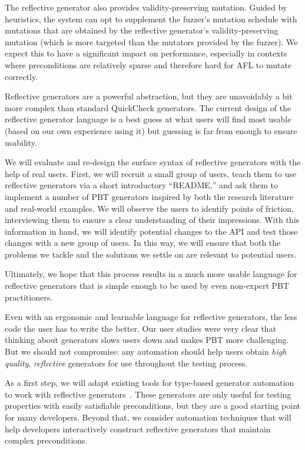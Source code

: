 The reflective generator also provides validity-preserving mutation. Guided by
heuristics, the system can opt to supplement the fuzzer's mutation schedule with
mutations that are obtained by the reflective generator's validity-preserving
mutation (which is more targeted than the mutators provided by the fuzzer). We
expect this to have a significant impact on performance, especially in contexts
where preconditions are relatively sparse and therefore hard for AFL to mutate
correctly.

Reflective generators are a powerful abstraction, but they are unavoidably a bit
more complex than standard QuickCheck generators. The current design of the
reflective generator language is a best guess at what users will find most
usable (based on our own experience using it) but guessing is far from enough to
ensure usability.

We will evaluate and re-design the surface syntax of reflective generators with
the help of real users.  First, we will recruit a small group of users, teach
them to use reflective generators via a short introductory ``README,'' and ask
them to implement a number of PBT generators inspired by both the research
literature and real-world examples. We will observe the users to identify points
of friction, interviewing them to ensure a clear understanding of their
impressions. With this information in hand, we will identify potential changes
to the API and test those changes with a new group of users. In this way, we
will ensure that both the problems we tackle and the solutions we settle on are
relevant to potential users.

Ultimately, we hope that this process results in a much more usable language for
reflective generators that is simple enough to be used by even non-expert PBT
practitioners.

%
Even with an ergonomic and learnable language for reflective generators, the
less code the user has to write the better. Our user studies were very clear
that thinking about generators slows users down and makes PBT more challenging.
But we should not compromise: any automation should help users obtain {\em high
quality}, {\em reflective} generators for use throughout the testing process.

As a first step, we will adapt existing tools for type-based generator
automation to work with reflective generators~\cite{noauthor_lysxia_nodate}.
These generators are only useful for testing properties with easily satisfiable
preconditions, but they are a good starting point for many developers. Beyond
that, we consider automation techniques that will help developers interactively
construct reflective generators that maintain complex preconditions.

